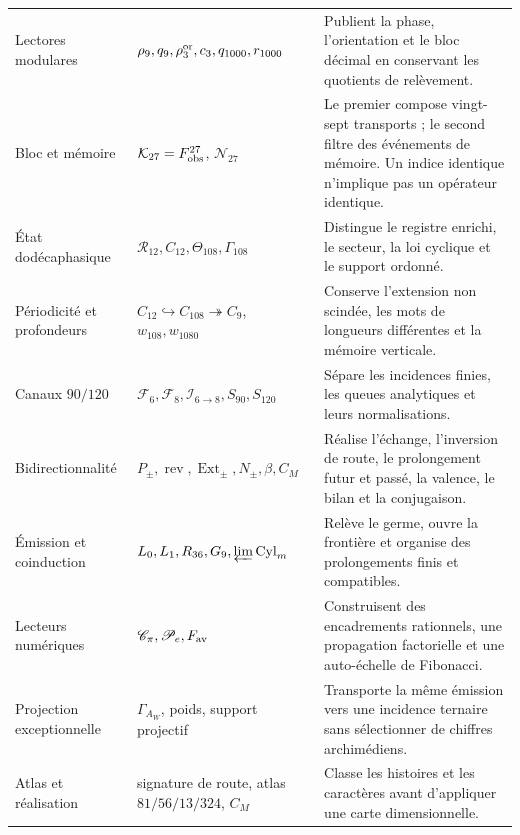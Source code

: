 {\begin{longtable}{@{}>{\raggedright\arraybackslash}p{}>{\raggedright\arraybackslash}p{}>{\raggedright\arraybackslash}p{}@{}}
Lectores modulares&
\(\rho_9,q_9,\rho_3^{\rm or},c_3,q_{1000},r_{1000}\)&
Publient la phase, l’orientation et le bloc décimal en conservant les quotients de
relèvement.\\

Bloc et mémoire&
\(\mathcal K_{27}=F_{\rm obs}^{27}\), \(\mathcal N_{27}\)&
Le premier compose vingt-sept transports ; le second filtre des événements de
mémoire. Un indice identique n’implique pas un opérateur identique.\\

État dodécaphasique&
\(\mathcal R_{12},C_{12},\Theta_{108},\Gamma_{108}\)&
Distingue le registre enrichi, le secteur, la loi cyclique et le support ordonné.\\

Périodicité et profondeurs&
\(C_{12}\hookrightarrow C_{108}\twoheadrightarrow C_9\),
\(w_{108},w_{1080}\)&
Conserve l’extension non scindée, les mots de longueurs différentes et
la mémoire verticale.\\

Canaux \(90/120\)&
\(\mathcal F_6,\mathcal F_8,\mathcal I_{6\to8},
S_{90},S_{120}\)&
Sépare les incidences finies, les queues analytiques et leurs normalisations.\\

Bidirectionnalité&
\(P_\pm,\operatorname{rev},\operatorname{Ext}_\pm,
N_\pm,\beta,C_M\)&
Réalise l’échange, l’inversion de route, le prolongement futur et passé,
la valence, le bilan et la conjugaison.\\

Émission et coinduction&
\(L_0,L_1,R_{36},G_9,\varprojlim\operatorname{Cyl}_m\)&
Relève le germe, ouvre la frontière et organise des prolongements finis et
compatibles.\\

Lecteurs numériques&
\(\mathscr C_\pi,\mathscr P_e,F_{\rm av}\)&
Construisent des encadrements rationnels, une propagation factorielle et une auto-échelle de
Fibonacci.\\

Projection exceptionnelle&
\(\Gamma_{A_W}\), poids, support projectif&
Transporte la même émission vers une incidence ternaire sans sélectionner de chiffres
archimédiens.\\

Atlas et réalisation&
signature de route, atlas \(81/56/13/324\), \(C_M\)&
Classe les histoires et les caractères avant d’appliquer une carte dimensionnelle.\\


\end{longtable}}
